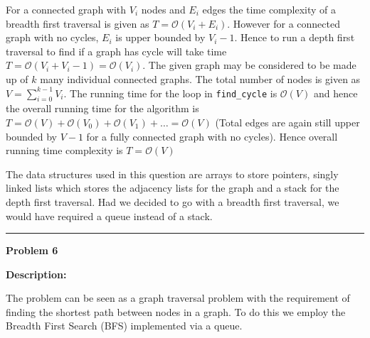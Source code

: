 \documentclass[10pt, a4paper]{article}
\newcommand{\BigO}{\mathcal{O}}
\begin{document}
For a connected graph with $V_i$ nodes and $E_i$ edges the time complexity of a breadth first traversal is given as $T = \BigO(V_i + E_i)$. However for a connected graph with no cycles, $E_i$ is upper bounded by $V_i - 1$. Hence to run a depth first traversal to find if a graph has cycle will take time $T = \BigO(V_i + V_i -1) = \BigO(V_i)$. The given graph may be considered to be made up of $k$ many individual connected graphs. The total number of nodes is given as $V = \sum_{i=0}^{k-1} V_i$. The running time for the loop in \lstinline{find_cycle} is $\BigO(V)$ and hence the overall running time for the algorithm is $T = \BigO(V) + \BigO(V_0) + \BigO(V_1) + \dots = \BigO(V)$ (Total edges are again still upper bounded by $V-1$ for a fully connected graph with no cycles). Hence overall running time complexity is $T= \BigO(V)$

The data structures used in this question are arrays to store pointers, singly linked lists which stores the adjacency lists for the graph and a stack for the depth first traversal. Had we decided to go with a breadth first traversal, we would have required a queue instead of a stack.

\rule{\textwidth}{0.8pt}
\vspace{5pt}

\large{\textbf{Problem 6}}
\normalsize

\textbf{Description:}

The problem can be seen as a graph traversal problem with the requirement of finding the shortest path between nodes in a graph. To do this we employ the Breadth First Search (BFS) implemented via a queue.
\end{document}
